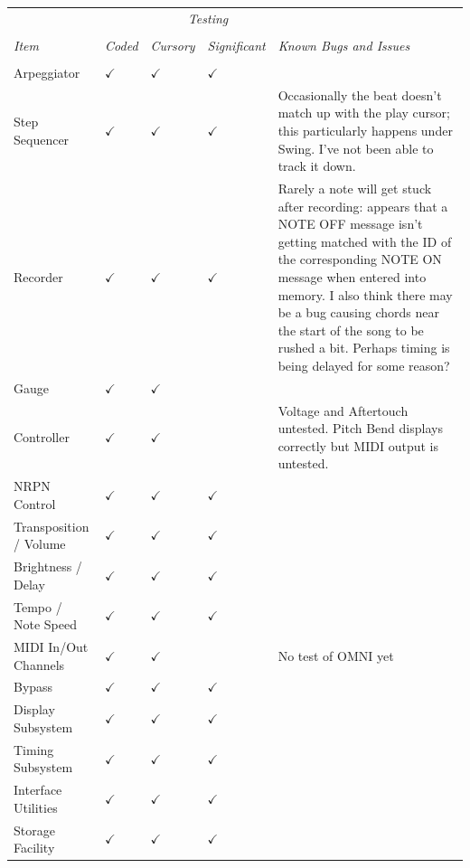 \documentclass{article}
\begin{document}
\begin{center}
{
\setlength\extrarowheight{0.3em}
\begin{tabular}{@{}llllp{2.8in}@{}}
&&\multicolumn{2}{c}{\it Testing}&\\[0.1em]
\cline{3-4}\\[-0.9em]
{\it Item} & {\it Coded} & {\it Cursory} & {\it Significant} & {\it Known Bugs and Issues}\\[0.1em]
		\hline\\[-1.5em]
Arpeggiator& $\checkmark$ & $\checkmark$ & $\checkmark$  & \\
Step Sequencer& $\checkmark$ & $\checkmark$ & $\checkmark$ & Occasionally the beat doesn't match up with the play cursor; this particularly happens under Swing.  I've not been able to track it down.\\
Recorder& $\checkmark$ & $\checkmark$ & $\checkmark$ & Rarely a note will get stuck after recording: appears that a NOTE OFF message isn't getting matched with the ID of the corresponding NOTE ON message when entered into memory.  
I also think there may be a bug causing chords near the start of the song to be rushed a bit.  Perhaps timing is being delayed for some reason?\\
Gauge& $\checkmark$ & $\checkmark$ &\\ 
Controller& $\checkmark$ & $\checkmark$ & & Voltage and Aftertouch untested.  Pitch Bend displays correctly but MIDI output is untested.\\ 
NRPN Control  &  $\checkmark$ & $\checkmark$ &  $\checkmark$ &\\
Transposition / Volume  &  $\checkmark$ & $\checkmark$ &  $\checkmark$ &\\
Brightness / Delay  &  $\checkmark$ & $\checkmark$ &  $\checkmark$ &\\
Tempo / Note Speed &  $\checkmark$ & $\checkmark$ &  $\checkmark$ &\\
MIDI In/Out Channels &  $\checkmark$ & $\checkmark$ &  & No test of OMNI yet\\
Bypass &  $\checkmark$ & $\checkmark$ &  $\checkmark$ &\\
Display Subsystem  &  $\checkmark$ & $\checkmark$ &  $\checkmark$ &\\
Timing  Subsystem &  $\checkmark$ & $\checkmark$ &  $\checkmark$ &\\
Interface Utilities &  $\checkmark$ & $\checkmark$ &  $\checkmark$ & \\
Storage Facility &  $\checkmark$ & $\checkmark$ &  $\checkmark$ &\\

\end{tabular}}
\end{center}
\end{document}
